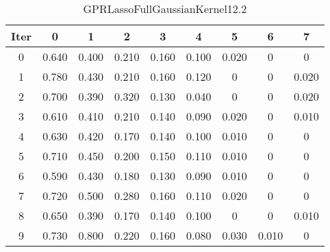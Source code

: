 \begin{table}
	\begin{center}
		\begin{tabular}{|c|c|c|c|c|c|c|c|c|}
			\hline
			Iter & 0 & 1 & 2 & 3 & 4 & 5 & 6 & 7 \\
			\hline
			0 & 0.640 & 0.400 & 0.210 & 0.160 & 0.100 & 0.020 & 0 & 0 \\
			\hline
			1 & 0.780 & 0.430 & 0.210 & 0.160 & 0.120 & 0 & 0 & 0.020 \\
			\hline
			2 & 0.700 & 0.390 & 0.320 & 0.130 & 0.040 & 0 & 0 & 0.020 \\
			\hline
			3 & 0.610 & 0.410 & 0.210 & 0.140 & 0.090 & 0.020 & 0 & 0.010 \\
			\hline
			4 & 0.630 & 0.420 & 0.170 & 0.140 & 0.100 & 0.010 & 0 & 0 \\
			\hline
			5 & 0.710 & 0.450 & 0.200 & 0.150 & 0.110 & 0.010 & 0 & 0 \\
			\hline
			6 & 0.590 & 0.430 & 0.180 & 0.130 & 0.090 & 0.010 & 0 & 0 \\
			\hline
			7 & 0.720 & 0.500 & 0.280 & 0.160 & 0.110 & 0.020 & 0 & 0 \\
			\hline
			8 & 0.650 & 0.390 & 0.170 & 0.140 & 0.100 & 0 & 0 & 0.010 \\
			\hline
			9 & 0.730 & 0.800 & 0.220 & 0.160 & 0.080 & 0.030 & 0.010 & 0 \\
			\hline
		\end{tabular}
	\end{center}
	\caption{GPRLassoFullGaussianKernel12.2}
\end{table}